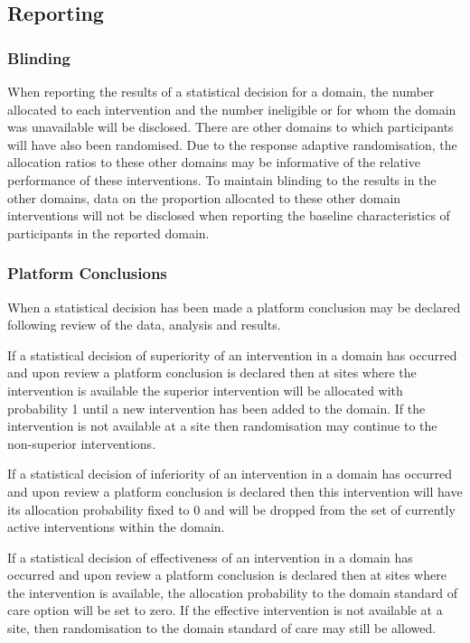 \documentclass[
  11pt,
]{article}
\begin{document}
\hypertarget{reporting}{%
\subsection{Reporting}\label{reporting}}

\hypertarget{blinding}{%
\subsubsection{Blinding}\label{blinding}}

When reporting the results of a statistical decision for a domain, the number allocated to each intervention and the number ineligible or for whom the domain was unavailable will be disclosed. There are other domains to which participants will have also been randomised. Due to the response adaptive randomisation, the allocation ratios to these other domains may be informative of the relative performance of these interventions. To maintain blinding to the results in the other domains, data on the proportion allocated to these other domain interventions will not be disclosed when reporting the baseline characteristics of participants in the reported domain.

\hypertarget{platform-conclusions}{%
\subsubsection{Platform Conclusions}\label{platform-conclusions}}

When a statistical decision has been made a platform conclusion may be declared following review of the data, analysis and results.

If a statistical decision of superiority of an intervention in a domain has occurred and upon review a platform conclusion is declared then at sites where the intervention is available the superior intervention will be allocated with probability 1 until a new intervention has been added to the domain. If the intervention is not available at a site then randomisation may continue to the non-superior interventions.

If a statistical decision of inferiority of an intervention in a domain has occurred and upon review a platform conclusion is declared then this intervention will have its allocation probability fixed to 0 and will be dropped from the set of currently active interventions within the domain.

If a statistical decision of effectiveness of an intervention in a domain has occurred and upon review a platform conclusion is declared then at sites where the intervention is available, the allocation probability to the domain standard of care option will be set to zero. If the effective intervention is not available at a site, then randomisation to the domain standard of care may still be allowed.
\end{document}
